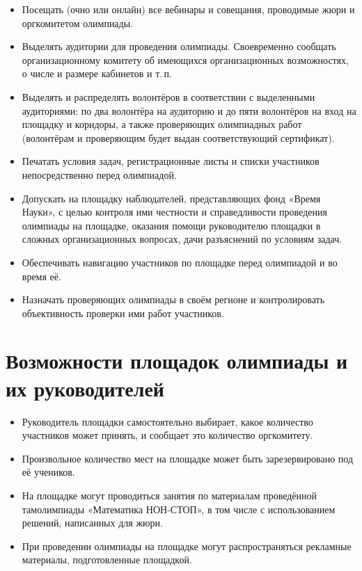 \documentclass[a4paper,12pt]{article}
\newcommand{\mns}{«Математика НОН-СТОП»\xspace}
\begin{document}
\begin{itemize}
	\item Посещать (очно или онлайн) все вебинары и совещания, проводимые жюри и оргкомитетом олимпиады.
	\item Выделять аудитории для проведения олимпиады. Своевременно сообщать организационному комитету об имеющихся организационных возможностях, о числе и размере кабинетов и т.\,п.
	\item Выделять и распределять волонтёров в соответствии с выделенными аудиториями: по два волонтёра на аудиторию и до пяти волонтёров на вход на площадку и коридоры, а также проверяющих олимпиадных работ (волонтёрам и проверяющим будет выдан соответствующий сертификат).
	\item Печатать условия задач, регистрационные листы и списки участников непосредственно перед олимпиадой.
	\item Допускать на площадку наблюдателей, представляющих фонд «Время Науки», с целью контроля ими честности и справедливости проведения олимпиады на площадке, оказания помощи руководителю площадки в сложных организационных вопросах, дачи разъяснений по условиям задач.
	\item Обеспечивать навигацию участников по площадке перед олимпиадой и во время её.
	\item Назначать проверяющих олимпиады в своём регионе и контролировать объективность проверки ими работ участников.
\end{itemize}

\section{Возможности площадок олимпиады и их руководителей}

\begin{itemize}
	\item Руководитель площадки самостоятельно выбирает, какое количество участников может принять, и сообщает это количество оргкомитету.
	\item Произвольное количество мест на площадке может быть зарезервировано под её учеников.
	\item На площадке могут проводиться занятия по материалам проведённой там\linebreak олимпиады \mns, в том числе с использованием решений, написанных для жюри.
	\item При проведении олимпиады на площадке могут распространяться рекламные материалы, подготовленные площадкой.
\end{itemize}
\end{document}
